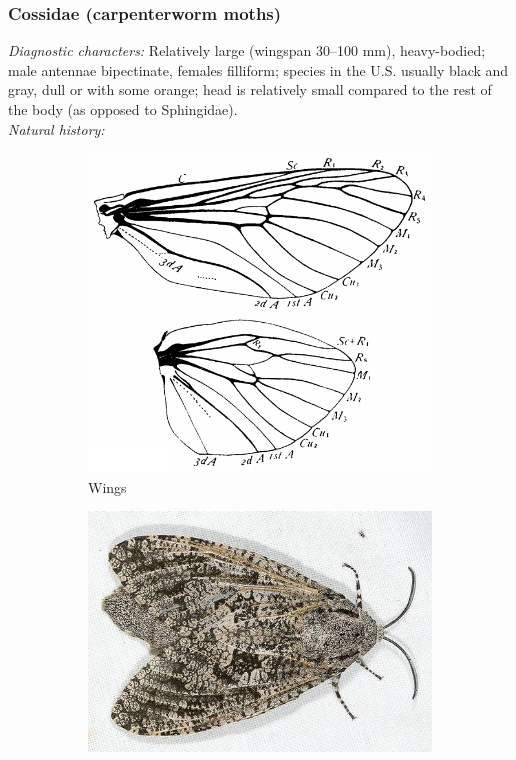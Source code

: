 \documentclass[letterpaper, 11pt]{article}
\begin{document}
\subsubsection{Cossidae (carpenterworm moths)}
\noindent{}\textit{Diagnostic characters:} Relatively large (wingspan 30--100 mm), heavy-bodied; male antennae bipectinate, females filliform; species in the U.S. usually black and gray, dull or with some orange; head is relatively small compared to the rest of the body (as opposed to Sphingidae).\\

\noindent{}\textit{Natural history:} 

\begin{figure}[ht!]
    \centering
    \begin{subfigure}[ht!]{0.38\textwidth}
        \includegraphics[width=\textwidth]{CossidWings}
        \caption{Wings \citep[Fig. 343]{comstock1918wings}}
        \label{fig:cossid1}
    \end{subfigure}
    \qquad %
    \begin{subfigure}[ht!]{0.48\textwidth}
        \includegraphics[width=\textwidth]{image43}

\end{subfigure}
\end{figure}
\end{document}
